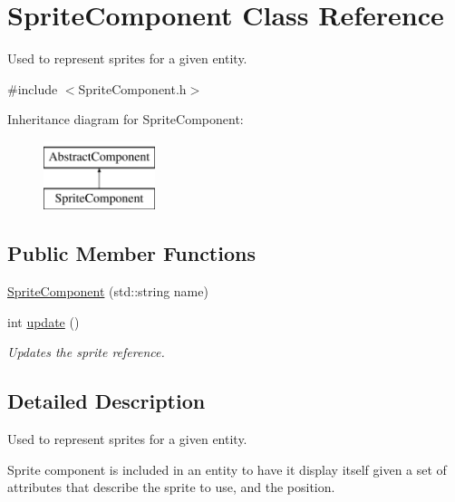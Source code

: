 \hypertarget{class_sprite_component}{\section{Sprite\-Component Class Reference}
\label{d4/df5/class_sprite_component}
}


Used to represent sprites for a given entity.  




{\ttfamily \#include $<$Sprite\-Component.\-h$>$}

Inheritance diagram for Sprite\-Component\-:\begin{figure}[H]
\begin{center}
\leavevmode
\includegraphics[height=2.000000cm]{d4/df5/class_sprite_component}
\end{center}
\end{figure}
\subsection*{Public Member Functions}
\begin{DoxyCompactItemize}
\item 
\hyperlink{class_sprite_component_a36cebab8b302188e1d6eddd24a166708}{Sprite\-Component} (std\-::string name)
\item 
int \hyperlink{class_sprite_component_a3518ccb69a3c829d5dcdc2dc024447ea}{update} ()
\begin{DoxyCompactList}\small\item\em Updates the sprite reference. \end{DoxyCompactList}\end{DoxyCompactItemize}


\subsection{Detailed Description}
Used to represent sprites for a given entity. 

Sprite component is included in an entity to have it display itself given a set of attributes that describe the sprite to use, and the position. 

